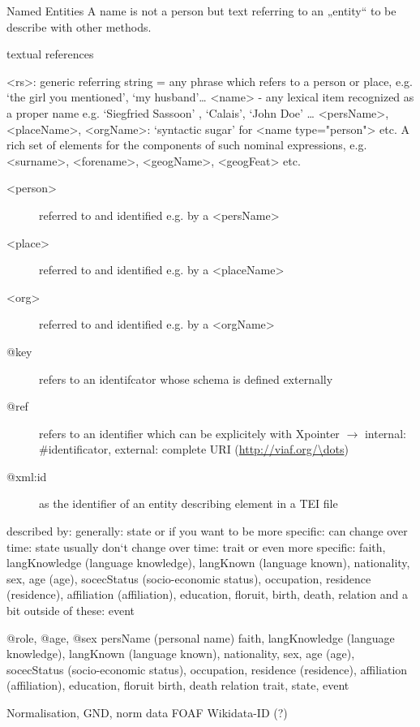 \begin{frame}{Named Entities}
A name is not a person
but text referring to an „entity“ to be describe with other methods.

textual references

<rs>: generic referring string = any phrase which refers to a person or place, e.g. ‘the girl you mentioned’, ‘my husband’\dots
<name> - any lexical item recognized as a proper name e.g. ‘Siegfried Sassoon’ , ‘Calais’, ‘John Doe’ \dots
<persName>, <placeName>, <orgName>: ‘syntactic sugar’ for <name type="person"> etc. 
A rich set of elements for the components of such nominal expressions, e.g. <surname>, <forename>, <geogName>, <geogFeat> etc.

\begin{description}
\item[<person>] referred to and identified e.g. by a <persName>
\item[<place>] referred to and identified e.g. by a <placeName>
\item[<org>] referred to and identified e.g. by a <orgName>
\end{description}

\begin{description}
     \item[@key] refers to an identifcator whose schema is defined externally
     \item[@ref] refers to an identifier which can be explicitely with Xpointer $\to$ internal: \#identificator, external: complete URI (\protect\url{http://viaf.org/\dots})
     \item[@xml:id] as the identifier of an entity describing element in a TEI file
\end{description}

described by:
generally: state
or if you want to be more specific:
can change over time: state
usually don‘t change over time: trait
or even more specific:
faith, langKnowledge (language knowledge), langKnown (language known), nationality, sex, age (age), socecStatus (socio-economic status), occupation, residence (residence), affiliation (affiliation), education, floruit, birth, death, relation
and a bit outside of these: event


@role, @age, @sex
persName (personal name)
faith, langKnowledge (language knowledge), langKnown (language known), nationality, sex, age (age), socecStatus (socio-economic status), occupation, residence (residence), affiliation (affiliation), education, floruit
birth, death
relation
trait, state, event


Normalisation, GND, norm data
FOAF
Wikidata-ID (?)


\end{frame}
